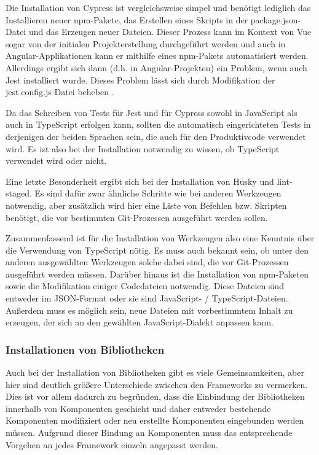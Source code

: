 Die Installation von Cypress ist vergleichsweise simpel und benötigt lediglich das Installieren neuer \gls{npm}-Pakete, das Erstellen eines Skripts in der package.json-Datei und das Erzeugen neuer Dateien. Dieser Prozess kann im Kontext von Vue sogar von der initialen Projekterstellung durchgeführt werden und auch in Angular-Applikationen kann er mithilfe eines \gls{npm}-Pakets automatisiert werden. Allerdings ergibt sich dann (d.h. in Angular-Projekten) ein Problem, wenn auch Jest installiert wurde. Dieses Problem lässt sich durch Modifikation der jest.config.js-Datei beheben \cite{angular_jest_cypress_issue}.

Da das Schreiben von Tests für Jest und für Cypress sowohl in JavaScript als auch in TypeScript erfolgen kann, sollten die automatisch eingerichteten Tests in derjenigen der beiden Sprachen sein, die auch für den Produktivcode verwendet wird. Es ist also bei der Installation notwendig zu wissen, ob TypeScript verwendet wird oder nicht.

Eine letzte Besonderheit ergibt sich bei der Installation von Husky und lint-staged. Es sind dafür zwar ähnliche Schritte wie bei anderen Werkzeugen notwendig, aber zusätzlich wird hier eine Liste von Befehlen bzw. Skripten benötigt, die vor bestimmten Git-Prozessen ausgeführt werden sollen.

Zusammenfassend ist für die Installation von Werkzeugen also eine Kenntnis über die Verwendung von TypeScript nötig. Es muss auch bekannt sein, ob unter den anderen ausgewählten Werkzeugen solche dabei sind, die vor Git-Prozessen ausgeführt werden müssen. Darüber hinaus ist die Installation von \gls{npm}-Paketen sowie die Modifikation einiger Codedateien notwendig. Diese Dateien sind entweder im \gls{JSON}-Format oder sie sind JavaScript- / TypeScript-Dateien. Außerdem muss es möglich sein, neue Dateien mit vorbestimmtem Inhalt zu erzeugen, der sich an den gewählten JavaScript-Dialekt anpassen kann.

\subsubsection{Installationen von Bibliotheken}
Auch bei der Installation von Bibliotheken gibt es viele Gemeinsamkeiten, aber hier sind deutlich größere Unterschiede zwischen den Frameworks zu vermerken. Dies ist vor allem dadurch zu begründen, dass die Einbindung der Bibliotheken innerhalb von Komponenten geschieht und daher entweder bestehende Komponenten modifiziert oder neu erstellte Komponenten eingebunden werden müssen. Aufgrund dieser Bindung an Komponenten muss das entsprechende Vorgehen an jedes Framework einzeln angepasst werden.

